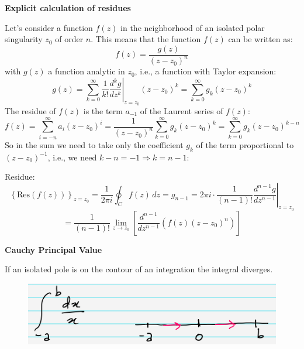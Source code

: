 \documentclass{article}
\begin{document}
\noindent
\textbf{Explicit calculation of residues}

\noindent
Let's consider a function \( f(z) \) in the neighborhood of an isolated polar singularity \( z_0 \) of order \( n \). This means that the function \( f(z) \) can be written as:
\begin{equation}
    f(z) = \frac{g(z)}{(z - z_0)^n}
\end{equation}
with \( g(z) \) a function analytic in \( z_0 \), i.e., a function with Taylor expansion:
\begin{equation}
    g(z) = \sum_{k=0}^{\infty} \frac{1}{k!} \left. \frac{d^k g}{dz^k} \right|_{z = z_0} (z - z_0)^k = \sum_{k=0}^{\infty} g_k (z - z_0)^k
\end{equation}
The residue of \( f(z) \) is the term \( a_{-1} \) of the Laurent series of \( f(z) \):
\begin{equation}
    f(z) = \sum_{i=-n}^{\infty} a_i (z - z_0)^i 
= \frac{1}{(z - z_0)^n} \sum_{k=0}^{\infty} g_k (z - z_0)^k 
= \sum_{k=0}^{\infty} g_k (z - z_0)^{k - n}
\end{equation}
So in the sum we need to take only the coefficient \( g_k \) of the term proportional to \( (z - z_0)^{-1} \),  
i.e., we need \( k - n= -1 \Rightarrow k = n - 1 \):

\noindent
Residue:
\begin{equation}
    \left\{ \text{Res}(f(z)) \right\}_{z = z_0} 
= \frac{1}{2\pi i} \oint_C f(z)\,dz 
= g_{n-1} = 2\pi i \cdot \frac{1}{(n-1)!} \left. \frac{d^{n-1} g}{dz^{n-1}} \right|_{z = z_0}
\end{equation}
\begin{equation}
    = \frac{1}{(n-1)!} \lim_{z \to z_0} \left[ \frac{d^{n-1}}{dz^{n-1}} \left( f(z) (z - z_0)^n \right) \right]
\end{equation}


\vspace{3mm} \noindent
\textbf{Cauchy Principal Value}

\noindent
If an isolated pole is on the contour of an integration the integral diverges.

\begin{figure}[h]
    \centering
    \includegraphics[width=0.5\linewidth]{fig31.png}
\end{figure}
\end{document}
